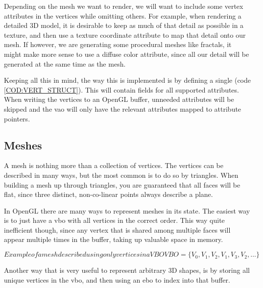
Depending on the mesh we want to render,
we will want to include some vertex attributes in the vertices while omitting others.
For example,
when rendering a detailed 3D model,
it is desirable to keep as much of that detail as possible in a texture,
and then use a texture coordinate attribute to map that detail onto our mesh.
If however,
we are generating some procedural meshes like fractals,
it might make more sense to use a diffuse color attribute,
since all our detail will be generated at the same time as the mesh.

Keeping all this in mind,
the way this is implemented is by defining a single  (code \ref{COD:VERT_STRUCT}).
This  will contain fields for all supported attributes.
When writing the vertices to an OpenGL buffer,
unneeded attributes will be skipped and the \ac{vao} will only have the relevant attributes mapped to attribute pointers.


\subsection{Meshes}


A mesh is nothing more than a collection of vertices.
The vertices can be described in many ways,
but the most common is to do so by triangles.
When building a mesh up through triangles,
you are guaranteed that all faces will be flat,
since three distinct,
non-co-linear points always describe a plane.

In OpenGL there are many ways to represent meshes in its state.
The easiest way is to just have a \ac{vbo} with all vertices in the correct order.
This way quite inefficient though,
since any vertex that is shared among multiple faces will appear multiple times in the buffer,
taking up valuable space in memory.

\begin{equation}[EQ:VBO]{Example of a mesh described using only vertices in a VBO}
\boxed{VBO = \{ V_0, V_1, V_2, V_1, V_3, V_2, \dots \}}
\end{equation}

Another way that is very useful to represent arbitrary 3D shapes,
is by storing all unique vertices in the \ac{vbo},
and then using an \ac{ebo} to index into that buffer.

